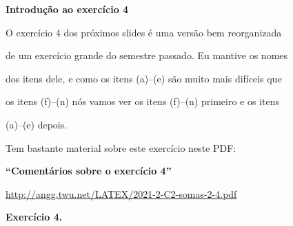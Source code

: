 \documentclass[oneside,12pt]{article}
\begin{document}

{\bf Introdução ao exercício 4}

\ssk

O exercício 4 dos próximos slides é uma versão bem reorganizada

de um exercício grande do semestre passado. Eu mantive os nomes

dos itens dele, e como os itens (a)--(e) são muito mais difíceis que

os itens (f)--(n) nós vamos ver os itens (f)--(n) primeiro e os itens

(a)--(e) depois.

\bsk

Tem bastante material sobre este exercício neste PDF:

\bsk

{\bf ``Comentários sobre o exercício 4''}


\ssk

{\footnotesize

\url{http://angg.twu.net/LATEX/2021-2-C2-somas-2-4.pdf}

}




\newpage

{\bf Exercício 4.}
\end{document}

